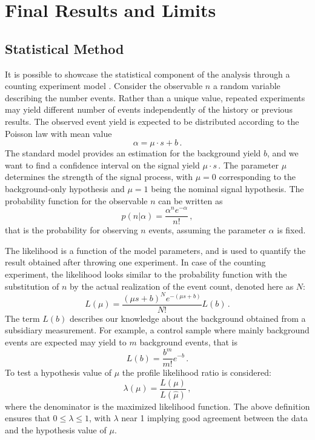 \chapter{Final Results and Limits}
\label{limits}

\section{Statistical Method}

It is possible to showcase the statistical component of the analysis through a counting experiment model \cite{Lista:2016tva}. Consider the observable $n$ a random variable describing the number events. Rather than a unique value, repeated experiments may yield different number of events independently of the history or previous results. The observed event yield is expected to be distributed according to the Poisson law with mean value
\begin{equation}
\alpha = \mu \cdot s + b\,.
\end{equation}
The standard model provides an estimation for the background yield $b$, and we want to find a confidence interval on the signal yield $\mu \cdot s$\,. The parameter $\mu$ determines the strength of the signal process, with $\mu = 0$ corresponding to the background-only hypothesis and $\mu = 1$ being the nominal signal hypothesis. The probability function for the observable $n$ can be written as
\begin{equation}
p(n | \alpha) = \frac{\alpha^n e^{-\alpha}}{n!}\,,
\end{equation}
that is the probability for observing $n$ events, assuming the parameter $\alpha$ is fixed. 

The likelihood is a function of the model parameters, and is used to quantify the result obtained after throwing one experiment. In case of the counting experiment, the likelihood looks similar to the probability function with the substitution of $n$ by the actual realization of the event count, denoted here as $N$:
\begin{equation}
L(\mu) = \frac{(\mu s + b)^N e^{-(\mu s + b)}}{N!} L(b) \,. 
\end{equation}
The term $L(b)$ describes our knowledge about the background obtained from a subsidiary measurement. For example, a control sample where mainly background events are expected may yield to $m$ background events, that is
\begin{equation}
L(b) =  \frac{b^m}{m!}e^{-b}\,.
\end{equation}
To test a hypothesis value of $\mu$ the profile likelihood ratio is considered:
\begin{equation}
\lambda(\mu) = \frac{L(\mu)}{L(\hat\mu)}\,,
\end{equation}
where the denominator is the maximized likelihood function. The above definition ensures that $0 \leq \lambda \leq 1$, with $\lambda$ near 1 implying good agreement between the data and the hypothesis value of $\mu$.

